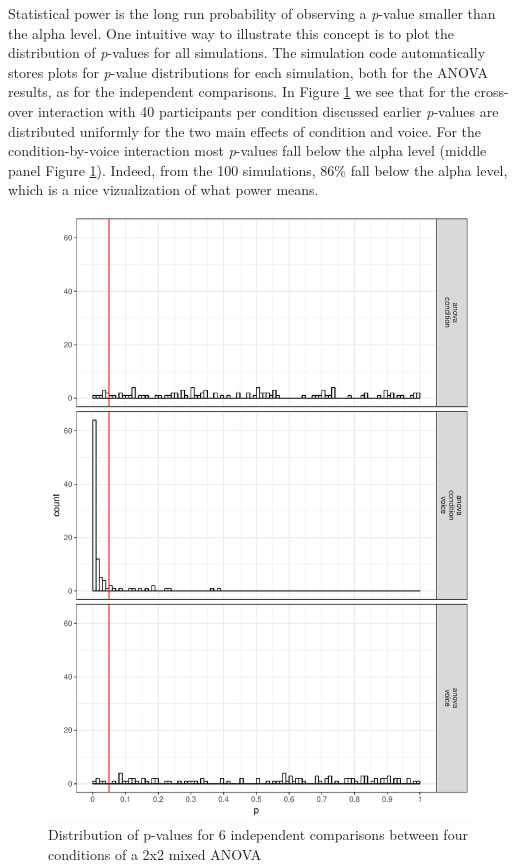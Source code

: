 \documentclass[,jou,floatsintext]{apa6}
\begin{document}
Statistical power is the long run probability of observing a \emph{p}-value smaller than the alpha level.
One intuitive way to illustrate this concept is to plot the distribution of \emph{p}-values for all simulations.
The simulation code automatically stores plots for \emph{p}-value distributions for each simulation, both for the ANOVA results, as for the independent comparisons.
In Figure \ref{fig:p-plot} we see that for the cross-over interaction with 40 participants per condition discussed earlier \emph{p}-values are distributed uniformly for the two main effects of condition and voice.
For the condition-by-voice interaction most \emph{p}-values fall below the alpha level (middle panel Figure \ref{fig:p-plot}).
Indeed, from the 100 simulations, 86\% fall below the alpha level, which is a nice vizualization of what power means.

\begin{figure}
\centering
\includegraphics{0.1_Simulation_Based_Power_Analysis_For_Factorial_ANOVA_Designs_files/figure-latex/p-plot-1.pdf}
\caption{\label{fig:p-plot}Distribution of p-values for 6 independent comparisons between four conditions of a 2x2 mixed ANOVA}
\end{figure}
\end{document}
